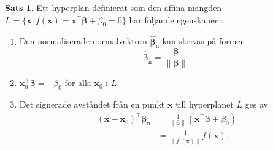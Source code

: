\documentclass[a4paper, 12pt]{report}
\theoremstyle{definition}
\newtheorem{thm}{Sats}[section]
\theoremstyle{remark}
\newcommand{\bfbeta}{{\boldsymbol{\beta}}}
\newcommand{\sephyp}{\{ \mathbf{x} : f(\mathbf{x})=\mathbf{x}^\intercal \bfbeta + \beta_0=0\}}
\begin{document}
\begin{thm}\label{thm:hyperplan}
	Ett hyperplan definierat som den affina mängden $L=\sephyp$ har följande egenskaper \cite{ESL}:
	\begin{enumerate}
		\item Den normaliserade normalvektorn $\widehat{\bfbeta}_\mathrm{n}$ kan skrivas på formen
		\begin{equation*}
			\widehat{\bfbeta}_\mathrm{n} = \frac{\bfbeta}{\|\bfbeta\|}.
		\end{equation*}
		\item $\mathbf{x}_0^\intercal \bfbeta = -\beta_0$ för alla $\mathbf{x}_0$ i $L$.
		\item Det signerade avståndet från en punkt $\mathbf{x}$ till hyperplanet $L$ ges av
		\begin{equation*}
		\begin{aligned}
			(\mathbf{x}-\mathbf{x}_0)^\intercal \widehat{\bfbeta}_\mathrm{n} &= \frac{1}{\|\bfbeta\|}(\mathbf{x}^\intercal \bfbeta+\beta_0)\\
			&= \frac{1}{\|f^\prime(\mathbf{x})\|}f(\mathbf{x}).
		\end{aligned}
		\end{equation*}
	\end{enumerate}
\end{thm}
\end{document}
